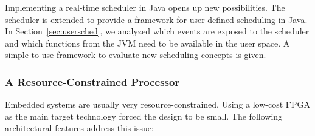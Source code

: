 
Implementing a real-time scheduler in Java opens up new
possibilities. The scheduler is extended to provide a framework for
user-defined scheduling in Java. In Section~\ref{sec:usersched}, we
analyzed which events are exposed to the scheduler and which
functions from the JVM need to be available in the user space. A
simple-to-use framework to evaluate new scheduling concepts is
given.



\subsubsection{A Resource-Constrained Processor}

Embedded systems are usually very resource-constrained. Using a
low-cost FPGA as the main target technology forced the design to be
small. The following architectural features address this issue:

